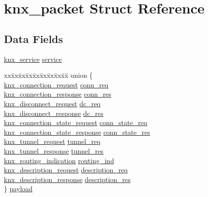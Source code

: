\hypertarget{structknx__packet}{}\section{knx\+\_\+packet Struct Reference}
\label{structknx__packet}
\subsection*{Data Fields}
\begin{DoxyCompactItemize}
\item 
\hyperlink{proto_8h_a79a58352734751991772fe02346cb547}{knx\+\_\+service} \hyperlink{structknx__packet_a261e009afb82702c74622ee1f1b71379}{service}
\item 
\begin{tabbing}
xx\=xx\=xx\=xx\=xx\=xx\=xx\=xx\=xx\=\kill
union \{\\
\>\hyperlink{structknx__connection__request}{knx\_connection\_request} \hyperlink{structknx__packet_a4b13c7c00d121f4d8b9d9dd642b7030b}{conn\_req}\\
\>\hyperlink{structknx__connection__response}{knx\_connection\_response} \hyperlink{structknx__packet_a249c9a779cb81c818cf8982e29903866}{conn\_res}\\
\>\hyperlink{structknx__disconnect__request}{knx\_disconnect\_request} \hyperlink{structknx__packet_ac73f1384f312aed4ece535b1af138e51}{dc\_req}\\
\>\hyperlink{structknx__disconnect__response}{knx\_disconnect\_response} \hyperlink{structknx__packet_a198251b1172c5289645b2db455d33cac}{dc\_res}\\
\>\hyperlink{structknx__connection__state__request}{knx\_connection\_state\_request} \hyperlink{structknx__packet_a55d76d312af07132d79dbbb82a06c3dc}{conn\_state\_req}\\
\>\hyperlink{structknx__connection__state__response}{knx\_connection\_state\_response} \hyperlink{structknx__packet_ad93a401097c6411efbdb1d470f3f205e}{conn\_state\_res}\\
\>\hyperlink{structknx__tunnel__request}{knx\_tunnel\_request} \hyperlink{structknx__packet_a23beb7d550b21c593033d2364d7ea81f}{tunnel\_req}\\
\>\hyperlink{structknx__tunnel__response}{knx\_tunnel\_response} \hyperlink{structknx__packet_a45c9dfca1be13c58ae8c1345874ca241}{tunnel\_res}\\
\>\hyperlink{structknx__routing__indication}{knx\_routing\_indication} \hyperlink{structknx__packet_a36d90ba08b5345368cf825593858f2ff}{routing\_ind}\\
\>\hyperlink{structknx__description__request}{knx\_description\_request} \hyperlink{structknx__packet_a0c3b07a198f28c1920fa6a9733031c5c}{description\_req}\\
\>\hyperlink{structknx__description__response}{knx\_description\_response} \hyperlink{structknx__packet_aec96c1383c69c27bc305d80fcb9b8d5e}{description\_res}\\
\} \hyperlink{structknx__packet_af2e942a6804bb6e75272fdd43881a775}{payload}\\

\end{tabbing}\end{DoxyCompactItemize}


